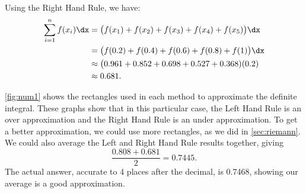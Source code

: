 {Using the Right Hand Rule, we have:
\begin{align*}
	\sum_{i=1}^n f(x_i)\dx
	&= \big(f(x_1)+f(x_2) + f(x_3) + f(x_4) + f(x_5)\big)\dx \\
	&= \big(f(0.2) + f(0.4) + f(0.6) + f(0.8)+f(1)\big)\dx \\
	&\approx \big(0.961 +0.852 + 0.698 + 0.527 + 0.368)(0.2)\\
	&\approx 0.681.
\end{align*}

\autoref{fig:num1} shows the rectangles used in each method to approximate the definite integral. These graphs show that in this particular case, the Left Hand Rule is an over approximation and the Right Hand Rule is an under approximation. To get a better approximation, we could use more rectangles, as we did in \autoref{sec:riemann}. We could also average the Left and Right Hand Rule results together, giving
\[\frac{0.808 + 0.681}{2} = 0.7445.\]
The actual answer, accurate to 4 places after the decimal, is 0.7468, showing our average is a good approximation.}


